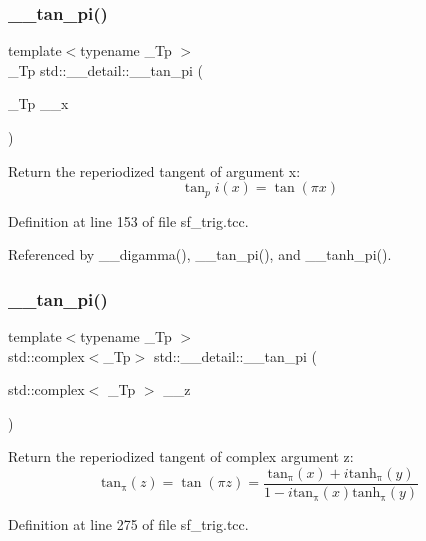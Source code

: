 \subsubsection{\texorpdfstring{\+\_\+\+\_\+tan\+\_\+pi()}{\_\_tan\_pi()}\hspace{0.1cm}{\footnotesize\ttfamily [1/2]}}
{\footnotesize\ttfamily template$<$typename \+\_\+\+Tp $>$ \\
\+\_\+\+Tp std\+::\+\_\+\+\_\+detail\+::\+\_\+\+\_\+tan\+\_\+pi (\begin{DoxyParamCaption}\item[{\+\_\+\+Tp}]{\+\_\+\+\_\+x }\end{DoxyParamCaption})}

Return the reperiodized tangent of argument x\+: \[ \tan_pi(x) = \tan(\pi x) \] 

Definition at line 153 of file sf\+\_\+trig.\+tcc.



Referenced by \+\_\+\+\_\+digamma(), \+\_\+\+\_\+tan\+\_\+pi(), and \+\_\+\+\_\+tanh\+\_\+pi().

\mbox{\label{namespacestd_1_1____detail_ae19d579db4245c9c4e53a70a0513bb00}} 
\subsubsection{\texorpdfstring{\+\_\+\+\_\+tan\+\_\+pi()}{\_\_tan\_pi()}\hspace{0.1cm}{\footnotesize\ttfamily [2/2]}}
{\footnotesize\ttfamily template$<$typename \+\_\+\+Tp $>$ \\
std\+::complex$<$\+\_\+\+Tp$>$ std\+::\+\_\+\+\_\+detail\+::\+\_\+\+\_\+tan\+\_\+pi (\begin{DoxyParamCaption}\item[{std\+::complex$<$ \+\_\+\+Tp $>$}]{\+\_\+\+\_\+z }\end{DoxyParamCaption})}

Return the reperiodized tangent of complex argument z\+: \[ \mathrm{tan_\pi}(z) = \tan(\pi z) = \frac{\mathrm{tan_\pi}(x) + i \mathrm{tanh_\pi}(y)} {1 - i \mathrm{tan_\pi}(x) \mathrm{tanh_\pi}(y)} \] 

Definition at line 275 of file sf\+\_\+trig.\+tcc.



